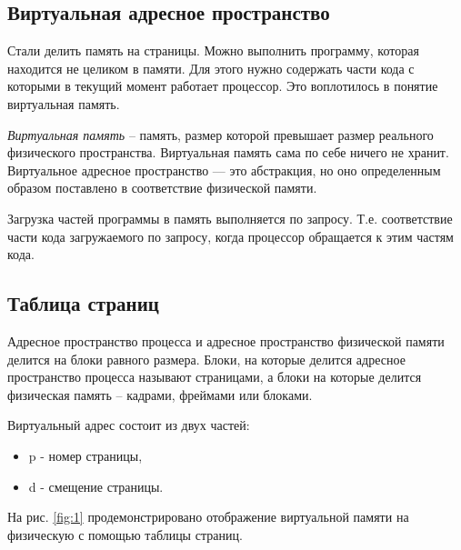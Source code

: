 \subsection{Виртуальная адресное пространство}

Стали делить память на страницы. Можно выполнить программу, которая находится не целиком в памяти. 
Для этого нужно содержать части кода с которыми в текущий момент работает процессор.
Это воплотилось в понятие виртуальная память.

\textit{Виртуальная память} – память, размер которой превышает размер реального физического пространства.
Виртуальная память сама по себе ничего не хранит. 
Виртуальное адресное пространство — это абстракция, но оно определенным образом поставлено в соответствие физической памяти.

Загрузка частей программы в память выполняется по запросу. 
Т.е. соответствие части кода загружаемого по запросу, когда процессор обращается к этим частям кода.

\subsection{Таблица страниц}

Адресное пространство процесса и адресное пространство физической памяти делится на блоки равного размера. Блоки, на которые делится адресное пространство процесса называют страницами, а блоки на которые делится физическая память – кадрами, фреймами или блоками.

Виртуальный адрес состоит из двух частей:

\begin{itemize}
	\item p - номер страницы,
	\item d - смещение страницы.
\end{itemize}

На рис. \ref{fig:1} продемонстрировано отображение виртуальной памяти на физическую с помощью таблицы страниц.

\begin{figure}[ht!]
\end{figure}


